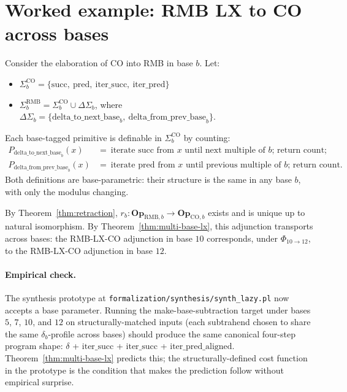 \documentclass[11pt]{article}
\begin{document}
\section{Worked example: RMB LX to CO across bases}

Consider the elaboration of CO into RMB in base $b$. Let:
\begin{itemize}[noitemsep,topsep=2pt]
  \item $\Sigma^{\mathrm{CO}}_b = \{\mathrm{succ},\
        \mathrm{pred},\ \mathrm{iter\_succ},\ \mathrm{iter\_pred}\}$
  \item $\Sigma^{\mathrm{RMB}}_b = \Sigma^{\mathrm{CO}}_b \cup
        \Delta\Sigma_b$, where
        $\Delta\Sigma_b = \{\mathrm{delta\_to\_next\_base}_b,\
        \mathrm{delta\_from\_prev\_base}_b\}$.
\end{itemize}
Each base-tagged primitive is definable in $\Sigma^{\mathrm{CO}}_b$
by counting:
\begin{align}
P_{\mathrm{delta\_to\_next\_base}_b}(x) &= \ \text{iterate } \mathrm{succ}
  \text{ from } x \text{ until next multiple of } b\text{; return count;} \\
P_{\mathrm{delta\_from\_prev\_base}_b}(x) &= \ \text{iterate }
  \mathrm{pred} \text{ from } x \text{ until previous multiple of }
  b\text{; return count.}
\end{align}
Both definitions are base-parametric: their structure is the same
in any base $b$, with only the modulus changing.

By Theorem~\ref{thm:retraction}, $r_b : \mathbf{Op}_{\mathrm{RMB}, b}
\to \mathbf{Op}_{\mathrm{CO}, b}$ exists and is unique up to natural
isomorphism. By Theorem~\ref{thm:multi-base-lx}, this adjunction
transports across bases: the RMB-LX-CO adjunction in base $10$
corresponds, under $\Phi_{10 \to 12}$, to the RMB-LX-CO adjunction
in base $12$.

\paragraph{Empirical check.} The synthesis prototype at
\texttt{formalization/synthesis/synth\_lazy.pl} now accepts a base
parameter. Running the make-base-subtraction target under bases $5$,
$7$, $10$, and $12$ on structurally-matched inputs (each subtrahend
chosen to share the same $\delta_b$-profile across bases) should
produce the same canonical four-step program shape: $\delta$ +
$\mathrm{iter\_succ}$ + $\mathrm{iter\_succ}$ +
$\mathrm{iter\_pred\_aligned}$. Theorem~\ref{thm:multi-base-lx}
predicts this; the structurally-defined cost function in the
prototype is the condition that makes the prediction follow without
empirical surprise.
\end{document}
